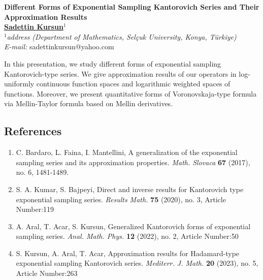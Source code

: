\documentclass[11pt]{book}
\begin{document}


\begin{center}
    \textsf{\textbf{\Large Different Forms of Exponential Sampling Kantorovich Series and Their Approximation Results}} \\[0.5cm]
    \textbf{\underline{Sadettin Kursun}$^{1}$} \\[0.2cm]
    $^{1}$\textit{address (Department of Mathematics, Selçuk University, Konya, Türkiye)} \\[0.05cm]
    \textit{E-mail:} \textsf{sadettinkursun@yahoo.com} \\[0.15cm]
\end{center}

\bigskip

In this presentation, we study different forms of exponential sampling Kantorovich-type series. We give approximation results of our operators in log-uniformly continuous function spaces and logarithmic weighted spaces of functions. Moreover, we present quantitative forms of Voronovskaja-type formula via Mellin-Taylor formula based on Mellin derivatives.

\subsection*{References}

\begin{enumerate}

\item[{[1]}] C. Bardaro, L. Faina, I. Mantellini, A generalization of the exponential sampling series and its approximation properties. \emph{Math. Slovaca} \textbf{67} (2017), no. 6, 1481-1489.

\vspace{-5pt}
\item[{[2]}] S. A. Kumar, S. Bajpeyi,   Direct and inverse results for Kantorovich type exponential sampling series. \emph{Results Math.} \textbf{75} (2020), no. 3, Article Number:119


\vspace{-5pt}
\item[{[3]}]  A. Aral, T. Acar, S. Kursun, Generalized Kantorovich forms of exponential sampling series. \emph{Anal. Math. Phys.} \textbf{12} (2022), no. 2, Article Number:50


\vspace{-5pt}
\item[{[4]}]  S. Kursun, A. Aral, T. Acar, Approximation results for Hadamard-type exponential sampling Kantorovich series. \emph{ Mediterr. J. Math.} \textbf{20} (2023), no. 5, Article Number:263
\end{enumerate}
\end{document}

